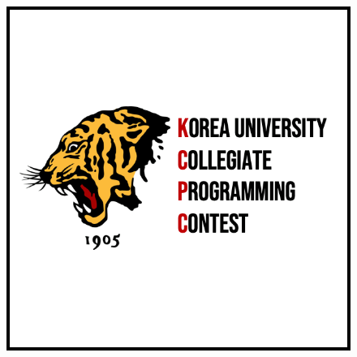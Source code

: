 \documentclass[11pt,a4paper,oneside,korean]{article}
\begin{document}

    \begin{titlepage}
        
    \end{titlepage}
    
    \begin{figure}[h]
        \centering
        \includegraphics[height=0.2\textheight]{./problems/KCPC_logo.png}
    \end{figure}
    
    
\end{document}
